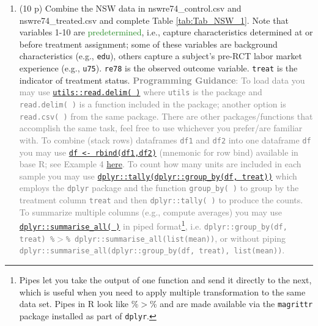 \documentclass{article}
\begin{document}
\begin{enumerate}[label=\textbf{Q\arabic{enumi}}.,ref=Q\arabic{enumi}, wide=0pt, itemsep=1em, topsep=5pt]
\item (10 p) Combine the NSW data in nswre74\_control.csv and nswre74\_treated.csv and complete Table \ref{tab:Tab_NSW_1}. Note that variables 1-10 are \textcolor{ForestGreen}{predetermined}, i.e., capture characteristics determined at or before treatment assignment; some of these variables are background characteristics (e.g., \texttt{edu}), others capture a subject's pre-RCT labor market experience (e.g., \texttt{u75}). \texttt{re78} is the observed outcome variable. \texttt{treat} is the indicator of treatment status. \textcolor{gray}{\textbf{Programming Guidance}: To load data you may use \href{https://www.rdocumentation.org/packages/utils/versions/3.6.2/topics/read.table}{\texttt{utils::read.delim( )}} where  \texttt{utils} is the package and  \texttt{read.delim( )} is a function included in the package; another option is \texttt{read.csv( )} from the same package. There are other packages/functions that accomplish the same task, feel free to use whichever you prefer/are familiar with. To combine (stack rows) dataframes \texttt{df1} and \texttt{df2} into one dataframe \texttt{df} you may use \href{https://www.rdocumentation.org/packages/base/versions/3.6.2/topics/cbind}{\texttt{df <- rbind(df1,df2)}} (mnemonic for row bind) available in base R; see Example 4 \href{https://www.statology.org/rbind-in-r/}{here}. To count how many units are included in each sample you may use \href{https://dplyr.tidyverse.org/reference/count.html}{\texttt{dplyr::tally(dplyr::group\_by(df, treat))}} which employs the \texttt{dplyr} package and the function \texttt{group\_by( )} to group by the treatment column \texttt{treat} and then \texttt{dplyr::tally( )} to produce the counts. To summarize multiple columns (e.g., compute averages) you may use \href{https://dplyr.tidyverse.org/reference/summarise_all.html}{\texttt{dplyr::summarise\_all( )}} in piped format\footnote{Pipes let you take the output of one function and send it directly to the next, which is useful when you need to apply multiple transformation to the same data set. Pipes in R look like \%$>$\% and are made available via the \texttt{magrittr} package installed as part of \texttt{dplyr}.}, i.e. \texttt{dplyr::group\_by(df, treat) \%$>$\% dplyr::summarise\_all(list(mean))}, or without piping \\\texttt{dplyr::summarise\_all(dplyr::group\_by(df, treat), list(mean))}.}
\end{enumerate}
\end{document}
